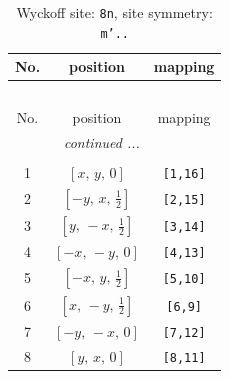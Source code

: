\documentclass[fleqn,8pt]{jsarticle}
\begin{document}
\begin{longtable}{ccc}
\caption{Wyckoff site: {\tt 8n}, site symmetry: {\tt m'..}}
 \\
 \hline \hline
No. & position & mapping \\ \hline \endfirsthead

\multicolumn{2}{l}{\tablename\ \thetable{}} \\
 \hline \hline
No. & position & mapping \\ \hline \endhead

 \hline \hline
\multicolumn{2}{r}{\footnotesize\it continued ...} \\ \endfoot

 \hline \hline
\multicolumn{2}{r}{} \\ \endlastfoot

1 & $\left[ x,\, y,\, 0 \right]$ & {\tt [1,16]} \\ \hline
2 & $\left[ - y,\, x,\, \frac{1}{2} \right]$ & {\tt [2,15]} \\ \hline
3 & $\left[ y,\, - x,\, \frac{1}{2} \right]$ & {\tt [3,14]} \\ \hline
4 & $\left[ - x,\, - y,\, 0 \right]$ & {\tt [4,13]} \\ \hline
5 & $\left[ - x,\, y,\, \frac{1}{2} \right]$ & {\tt [5,10]} \\ \hline
6 & $\left[ x,\, - y,\, \frac{1}{2} \right]$ & {\tt [6,9]} \\ \hline
7 & $\left[ - y,\, - x,\, 0 \right]$ & {\tt [7,12]} \\ \hline
8 & $\left[ y,\, x,\, 0 \right]$ & {\tt [8,11]} \\
\end{longtable}
\renewcommand{\arraystretch}{1.2}
\end{document}
